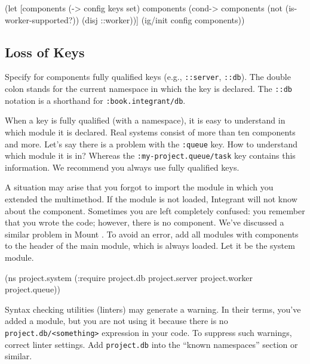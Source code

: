 \else

\begin{english}
  \begin{clojure}
(let [components (-> config keys set)
      components (cond-> components
                   (not (is-worker-supported?))
                   (disj ::worker))]
  (ig/init config components))
  \end{clojure}
\end{english}

\fi

\subsection{Loss of Keys}


Specify for components fully qualified keys (e.g., \verb|::server|, \verb|::db|). The double colon stands for the current namespace in which the key is declared. The \verb|::db| notation is a shorthand for \verb|:book.integrant/db|.

When a key is fully qualified (with a namespace), it is easy to understand in which module it is declared. Real systems consist of more than ten components and more. Let's say there is a problem with the \verb|:queue| key. How to understand which module it is in? Whereas the \texttt{:my-project.queue/task} key contains this information. We recommend you always use fully qualified keys.

A situation may arise that you forgot to import the module in which you extended the multimethod. If the module is not loaded, Integrant will not know about the component. Sometimes you are left completely confused: you remember that you wrote the code; however, there is no component. We've discussed a similar problem in Mount . To avoid an error, add all modules with components to the header of the main module, which is always loaded. Let it be the system module.

\begin{english}
  \begin{clojure}
(ns project.system
  (:require project.db
            project.server
            project.worker
            project.queue))
  \end{clojure}
\end{english}

Syntax checking utilities (linters) may generate a warning. In their terms, you've added a module, but you are not using it because there is no \verb|project.db/<something>| expression in your code. To suppress such warnings, correct linter settings. Add \verb|project.db| into the ``known namespaces'' section or similar.

